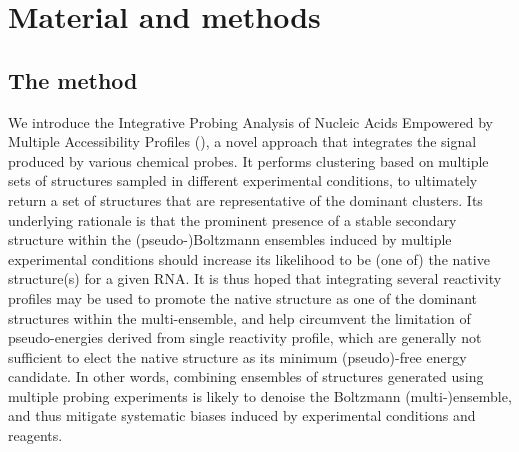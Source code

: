 \documentclass[a4,center,fleqn]{NAR}
\begin{document}
\section*{Material and methods}

\subsection*{The \OurTool{} method}
We introduce the Integrative Probing Analysis of Nucleic Acids Empowered by Multiple Accessibility Profiles (\OurTool{}), a novel approach that integrates the signal produced by various chemical probes. It performs clustering based on multiple sets of structures sampled in different experimental conditions, to ultimately return a set of structures that are representative of the dominant clusters. Its underlying rationale is that the prominent presence of a stable secondary structure within the  (pseudo-)Boltzmann ensembles induced by multiple experimental conditions should increase its likelihood to be (one of) the native structure(s) for a given RNA. It is thus hoped that integrating several reactivity profiles may be used to promote the native structure as one of the dominant structures within the multi-ensemble, and help circumvent the limitation of pseudo-energies derived from single reactivity profile, which are generally not sufficient to elect the native structure as its minimum (pseudo)-free energy candidate. In other words, combining ensembles of structures generated using multiple probing experiments is likely to denoise the Boltzmann (multi-)ensemble, and thus mitigate systematic biases induced by experimental conditions and reagents.
\end{document}
